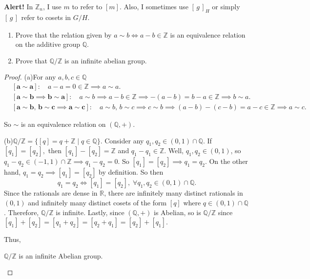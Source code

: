 \documentclass[addpoints,10pt]{exam}
\theoremstyle{plain}
\theoremstyle{definition}
\newtheorem{prob}[thm]{Problem}
\theoremstyle{plain}
\theoremstyle{plain}
\theoremstyle{definition}
\let\oldprob\prob
\let\endoldprob\endprob
\renewenvironment{prob}
  {\begin{singlespace}\oldprob}
  {\endoldprob\end{singlespace}}
\newcommand{\belowtitle}{\leavevmode\newline}
\newcommand{\class}[2][]{\ensuremath{\left[\,#2\,\right]_{#1}}}
\newcommand{\QQ}{\ensuremath{\mathbb{Q}}}
\newcommand{\RR}{\ensuremath{\mathbb{R}}}
\newcommand{\ZZ}{\ensuremath{\mathbb{Z}}}
\begin{document}
\setcounter{thm}{1}   %
\textbf{Alert!} In $\ZZ_{n}$, I use $m$ to refer to $[m]$. Also, I sometimes use $\class[H]{g}$ or simply $\class{g}$ refer to cosets in $G/H$.
\begin{prob}\belowtitle
  \begin{enumerate}[label=(\alph*)]
    \item Prove that the relation given by $a \sim b \iff a - b \in \mathbb{Z}$ is an equivalence relation on the additive group $\mathbb{Q}$.
    \item Prove that $\mathbb{Q}/\mathbb{Z}$ is an infinite abelian group.
  \end{enumerate}
\end{prob}

\begin{proof}\belowtitle
    (a)\quad For any $a,b,c\in \QQ$
    \begin{align*}
        &\mathbf{[a\sim a]:}\quad a-a=0\in \ZZ \implies a\sim a.\\
        &\mathbf{[a\sim b\implies b\sim a]:}\quad a\sim b\implies a-b\in \ZZ \implies -(a-b)=b-a\in \ZZ\implies  b\sim a.\\
        &\mathbf{[a\sim b,\,b\sim c\implies a\sim c]:}\quad a\sim b,\,b\sim c\implies c\sim b\implies (a-b)-(c-b)=a-c\in \ZZ\implies a\sim c.
    \end{align*}

    So $\sim$ is an equivalence relation on $(\QQ,+)$.

    (b)\quad $\QQ/\ZZ=\{[q]=q+\ZZ \mid q\in \QQ\}$. Consider any $q_{1},q_{2}\in (0,1)\cap \QQ$. If $[q_{1}]=[q_{2}],$ then $[q_{1}]-[q_{2}]=\ZZ$ and $q_{1}-q_{1}\in \ZZ$. Well, $q_{1},q_{2}\in (0,1)$, so $q_{1}-q_{2}\in (-1,1)\cap \ZZ\implies q_{1}-q_{2}=0$. So $[q_{1}]=[q_{2}]\implies q_{1}=q_{2}$. On the other hand, $q_{1}=q_{2}\implies [q_{1}]=[q_{2}]$ by definition. So then
    $$q_{1}=q_{2}\iff [q_{1}]=[q_{2}],\;\forall q_{1},q_{2}\in (0,1)\cap \QQ.$$
    Since the rationals are dense in $\RR$, there are infinitely many distinct rationals in $(0,1)$ and infinitely many distinct cosets of the form $[q]$ where $q\in (0,1)\cap \QQ$. Therefore, $\QQ/\ZZ$ is infinite. Lastly, since $(\QQ,+)$ is Abelian, so is $\QQ/\ZZ$ since $[q_{1}]+[q_{2}]=[q_{1}+q_{2}]=[q_{2}+q_{1}]=[q_{2}]+[q_{1}]$.

    Thus,
    \begin{center}
    $\QQ/\ZZ$ is an infinite Abelian group.
    \end{center}
\end{proof}
\newpage
\end{document}
